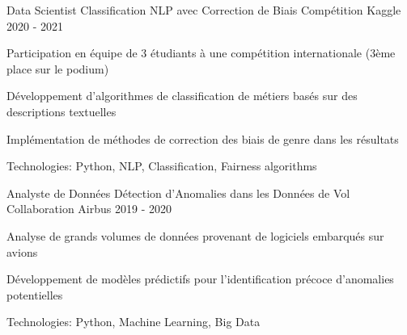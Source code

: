 \begin{cventries}
\cventry
{Data Scientist} %
{Classification NLP avec Correction de Biais} %
{Compétition Kaggle} %
{2020 - 2021} %
{ %
\begin{cvitems}
\item {Participation en équipe de 3 étudiants à une compétition internationale (3ème place sur le podium)}
\item {Développement d'algorithmes de classification de métiers basés sur des descriptions textuelles}
\item {Implémentation de méthodes de correction des biais de genre dans les résultats}
\item {Technologies: Python, NLP, Classification, Fairness algorithms}
\end{cvitems}
}
\vspace{1.5em}


\cventry
{Analyste de Données} %
{Détection d'Anomalies dans les Données de Vol} %
{Collaboration Airbus} %
{2019 - 2020} %
{ %
\begin{cvitems}
\item {Analyse de grands volumes de données provenant de logiciels embarqués sur avions}
\item {Développement de modèles prédictifs pour l'identification précoce d'anomalies potentielles}
\item {Technologies: Python, Machine Learning, Big Data}
\end{cvitems}
}
\vspace{1.5em}


\end{cventries}